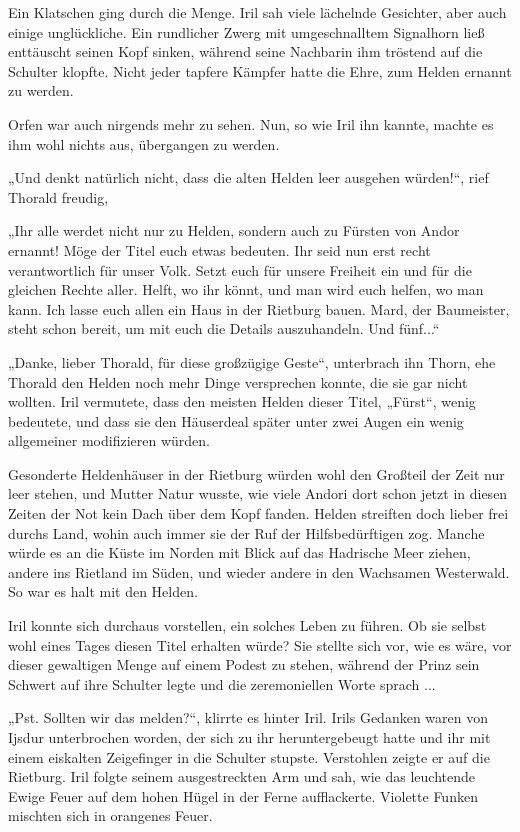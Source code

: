 Ein Klatschen ging durch die Menge. Iril sah viele lächelnde Gesichter, aber auch einige unglückliche. Ein rundlicher Zwerg mit umgeschnalltem Signalhorn ließ enttäuscht seinen Kopf sinken, während seine Nachbarin ihm tröstend auf die Schulter klopfte. Nicht jeder tapfere Kämpfer hatte die Ehre, zum Helden ernannt zu werden.

Orfen war auch nirgends mehr zu sehen. Nun, so wie Iril ihn kannte, machte es ihm wohl nichts aus, übergangen zu werden.

„Und denkt natürlich nicht, dass die alten Helden leer ausgehen würden!“, rief Thorald freudig,

„Ihr alle werdet nicht nur zu Helden, sondern auch zu Fürsten von Andor ernannt! Möge der Titel euch etwas bedeuten. Ihr seid nun erst recht verantwortlich für unser Volk. Setzt euch für unsere Freiheit ein und für die gleichen Rechte aller. Helft, wo ihr könnt, und man wird euch helfen, wo man kann. Ich lasse euch allen ein Haus in der Rietburg bauen. Mard, der Baumeister, steht schon bereit, um mit euch die Details auszuhandeln. Und fünf...“

„Danke, lieber Thorald, für diese großzügige Geste“, unterbrach ihn Thorn, ehe Thorald den Helden noch mehr Dinge versprechen konnte, die sie gar nicht wollten. Iril vermutete, dass den meisten Helden dieser Titel, „Fürst“, wenig bedeutete, und dass sie den Häuserdeal später unter zwei Augen ein wenig allgemeiner modifizieren würden.

Gesonderte Heldenhäuser in der Rietburg würden wohl den Großteil der Zeit nur leer stehen, und Mutter Natur wusste, wie viele Andori dort schon jetzt in diesen Zeiten der Not kein Dach über dem Kopf fanden. Helden streiften doch lieber frei durchs Land, wohin auch immer sie der Ruf der Hilfsbedürftigen zog. Manche würde es an die Küste im Norden mit Blick auf das Hadrische Meer ziehen, andere ins Rietland im Süden, und wieder andere in den Wachsamen Westerwald. So war es halt mit den Helden.

Iril konnte sich durchaus vorstellen, ein solches Leben zu führen. Ob sie selbst wohl eines Tages diesen Titel erhalten würde? Sie stellte sich vor, wie es wäre, vor dieser gewaltigen Menge auf einem Podest zu stehen, während der Prinz sein Schwert auf ihre Schulter legte und die zeremoniellen Worte sprach ...

„Pst. Sollten wir das melden?“, klirrte es hinter Iril. Irils Gedanken waren von Ijsdur unterbrochen worden, der sich zu ihr heruntergebeugt hatte und ihr mit einem eiskalten Zeigefinger in die Schulter stupste. Verstohlen zeigte er auf die Rietburg. Iril folgte seinem ausgestreckten Arm und sah, wie das leuchtende Ewige Feuer auf dem hohen Hügel in der Ferne aufflackerte. Violette Funken mischten sich in orangenes Feuer.

